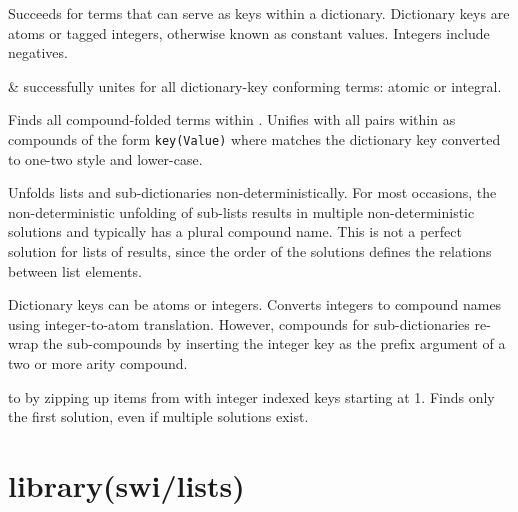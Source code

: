 \begin{description}
Succeeds for terms that can serve as keys within a dictionary.
Dictionary keys are atoms or tagged integers, otherwise known as
constant values. Integers include negatives.

\begin{arguments}
 & successfully unites for all dictionary-key conforming
terms: atomic or integral. \\
\end{arguments}

Finds all compound-folded terms within . Unifies with all pairs
within  as compounds of the form \verb$key(Value)$ where  matches
the dictionary key converted to one-two style and lower-case.

Unfolds lists and sub-dictionaries non-deterministically. For most
occasions, the non-deterministic unfolding of sub-lists results in
multiple non-deterministic solutions and typically has a plural
compound name. This is not a perfect solution for lists of results,
since the order of the solutions defines the relations between list
elements.

Dictionary keys can be atoms or integers. Converts integers to
compound names using integer-to-atom translation. However, compounds
for sub-dictionaries re-wrap the sub-compounds by inserting the
integer key as the prefix argument of a two or more arity compound.

 to  by zipping up items from  with integer indexed keys
starting at 1. Finds only the first solution, even if multiple
solutions exist.
\end{description}

\chapter{library(swi/lists)}\label{sec:lists}

